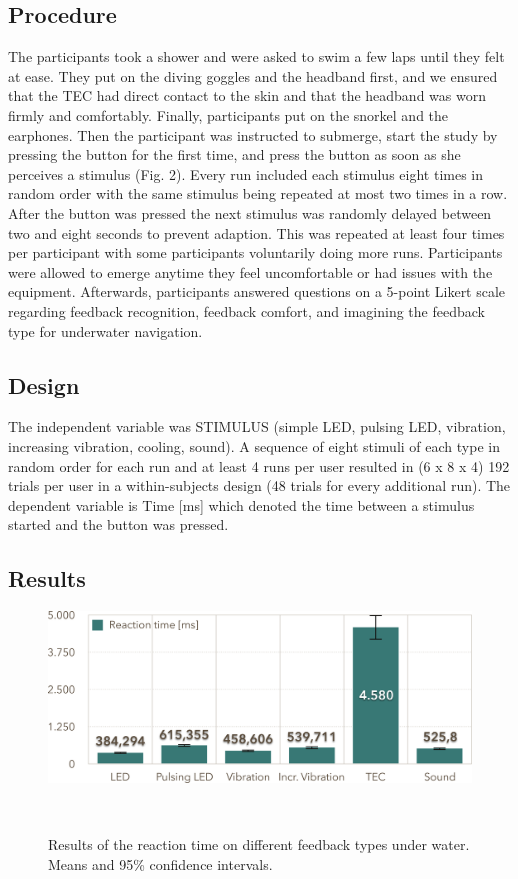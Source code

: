 \subsection{Procedure}
The participants took a shower and were asked to swim a few laps until they felt at ease. 
They put on the diving goggles and the headband first, and we ensured that the TEC had direct contact to the skin and that the headband was worn firmly and comfortably. 
Finally, participants put on the snorkel and the earphones. Then the participant was instructed to submerge, start the study by pressing the button for the first time, and press the button as soon as she perceives a stimulus (Fig. 2). 
Every run included each stimulus eight times in random order with the same stimulus being repeated at most two times in a row. After the button was pressed the next stimulus was randomly delayed between two and eight seconds to prevent adaption. 
This was repeated at least four times per participant with some participants voluntarily doing more runs. 
Participants were allowed to emerge anytime they feel uncomfortable or had issues with the equipment. 
Afterwards, participants answered questions on a 5-point Likert scale regarding feedback recognition, feedback comfort, and imagining the feedback type for underwater navigation.

\subsection{Design}
The independent variable was STIMULUS (simple LED, pulsing LED, vibration, increasing vibration, cooling, sound). 
A sequence of eight stimuli of each type in random order for each run and at least 4 runs per user resulted in (6 x 8 x 4) 192 trials per user in a within-subjects design (48 trials for every additional run). 
The dependent variable is Time [ms] which denoted the time between a stimulus started and the button was pressed.

\subsection{Results}
\begin{figure}
	\centering
	\includegraphics[width=\columnwidth]{images/ResultsOfReactionTimes}
	\caption{Results of the reaction time on different feedback types under water. Means and 95\% confidence intervals.}~\label{fig:reactiontimes}
	\vspace{-2em}
\end{figure}

